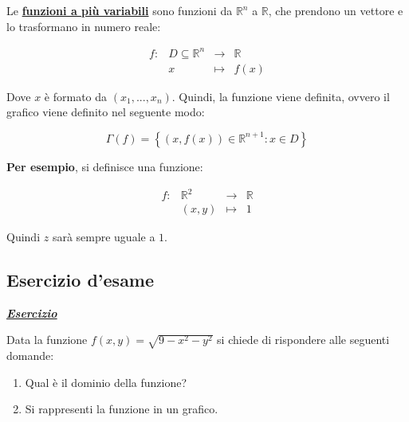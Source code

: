\documentclass[a4paper]{article}
\begin{document}
	Le \textcolor{Red3}{\textbf{\underline{funzioni a più variabili}}} sono funzioni da $\mathbb{R}^{n}$ a $\mathbb{R}$, che prendono un vettore e lo trasformano in numero reale:
	
	\begin{equation*}
		\begin{array}{lcll}
			f:	&	D \subseteq \mathbb{R}^{n}	& \longrightarrow & \mathbb{R} \\
				&	x							& \longmapsto	  & f\left(x\right)
		\end{array}
	\end{equation*}

	\noindent
	Dove $x$ è formato da $\left(x_{1}, ..., x_{n}\right)$. Quindi, la funzione viene definita, ovvero il grafico viene definito nel seguente modo:
	
	\begin{equation}\label{funzioni a più variabili}
		\Gamma\left(f\right) = \left\{\left(x, f\left(x\right)\right) \in \mathbb{R}^{n+1} : x \in D\right\}
	\end{equation}

	\noindent
	\textcolor{Green4}{\textbf{Per esempio}}, si definisce una funzione:
	
	\begin{equation*}
		\begin{array}{llll}
			f:	&	\mathbb{R}^{2}	& \longrightarrow & \mathbb{R} \\
				&	\left(x,y\right)& \longmapsto	  & 1
		\end{array}
	\end{equation*}

	\noindent
	Quindi $z$ sarà sempre uguale a $1$.
	
	\newpage
	
	\subsection{Esercizio d'\textcolor{Red3}{esame}}
	
	\textcolor{Red3}{\textbf{\emph{\underline{Esercizio}}}}\newline
	
	\noindent
	Data la funzione $f\left(x,y\right) = \sqrt{9 - x^{2} - y^{2}}$ si chiede di rispondere alle seguenti domande:
	
	\begin{enumerate}
		\item Qual è il dominio della funzione?
		\item Si rappresenti la funzione in un grafico.
	\end{enumerate}
\end{document}
